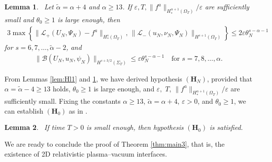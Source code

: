 \documentclass[twoside,11pt]{article}
\numberwithin{equation}{section}
\newtheorem{lemma}{Lemma}[section]
\begin{document}
\begin{lemma}\ \label{lem:Hl2}
	Let $\widetilde{\alpha}={\alpha }+4$ and ${\alpha }\geq 13$.
	If $\varepsilon,T, \|f^a\|_{H_*^{\alpha+1}(\Omega_{T})}/{\varepsilon}$ are sufficiently small and $\theta_0\geq 1$ is large enough, then
	\begin{alignat}{3}\label{Hl.b}
		\max\left\{\|\mathcal{L}_+( U_N,  \Psi_N)-f^a\|_{H_*^s(\Omega_{T})},\,
		\|\mathcal{L}_-( u_N,  \nu_N, \Psi_N)\|_{H^{s+1}(\Omega_{T})}\right\}
		\leq 2 \varepsilon \theta_{{N}}^{s-{\alpha }-1}
	\end{alignat}
	for  $s=6,7,\ldots,\widetilde{\alpha}-2$, and
	\begin{align}
		\label{Hl.c}
		\|\mathcal{B}( U_N, u_N, \psi_N) \|_{H^{s+3/2}(\Sigma_{T})}
		\leq  \varepsilon \theta_{{N}}^{s-{\alpha }-1}
		\quad  \textrm{for } s=7,8,\ldots,{\alpha }.
	\end{align}
\end{lemma}




From Lemmas \ref{lem:Hl1} and \ref{lem:Hl2}, we have derived hypothesis $(\mathbf{H}_{{N}})$,
provided that ${\alpha }=\widetilde{\alpha}-4\geq 13$ holds,
$\theta_0 \geq 1$ is large enough,
and $\varepsilon,$ $T$, $\|f^a\|_{H_*^{\alpha+1}(\Omega_{T})}/\varepsilon$ are sufficiently small.
Fixing the constants ${\alpha }\geq 13$, $\widetilde{\alpha}={\alpha }+4$,
$\varepsilon>0$, and $\theta_0\geq1$,
we can establish $(\mathbf{H}_{0})$ as in \cite[Lemma 17]{T09ARMAMR2481071}.

\begin{lemma}\ \label{lem:H0}
	If time $T>0$ is small enough, then hypothesis $(\mathbf{H}_0)$ is satisfied.
\end{lemma}



We are ready to conclude the proof of Theorem \ref{thm:main3}, that is, the existence of 2D relativistic plasma--vacuum interfaces.
\end{document}
